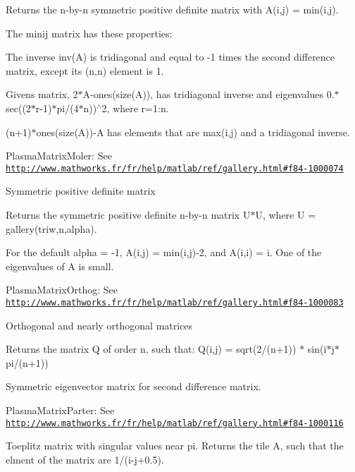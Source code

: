 Returns the n-\/by-\/n symmetric positive definite matrix with A(i,j) = min(i,j).

The minij matrix has these properties\+:
\begin{DoxyItemize}
\item The inverse inv(\+A) is tridiagonal and equal to -\/1 times the second difference matrix, except its (n,n) element is 1.
\item Givens\textquotesingle{} matrix, 2$\ast$\+A-\/ones(size(\+A)), has tridiagonal inverse and eigenvalues 0.$\ast$sec((2$\ast$r-\/1)$\ast$pi/(4$\ast$n))$^\wedge$2, where r=1\+:n.
\item (n+1)$\ast$ones(size(\+A))-\/\+A has elements that are max(i,j) and a tridiagonal inverse.
\end{DoxyItemize}

\begin{DoxyItemize}
\item Plasma\+Matrix\+Moler\+: See \href{http://www.mathworks.fr/fr/help/matlab/ref/gallery.html#f84-1000074}{\tt http\+://www.\+mathworks.\+fr/fr/help/matlab/ref/gallery.\+html\#f84-\/1000074}\end{DoxyItemize}
Symmetric positive definite matrix

Returns the symmetric positive definite n-\/by-\/n matrix U\textquotesingle{}$\ast$\+U, where U = gallery(\textquotesingle{}triw\textquotesingle{},n,alpha).

For the default alpha = -\/1, A(i,j) = min(i,j)-\/2, and A(i,i) = i. One of the eigenvalues of A is small.

\begin{DoxyItemize}
\item Plasma\+Matrix\+Orthog\+: See \href{http://www.mathworks.fr/fr/help/matlab/ref/gallery.html#f84-1000083}{\tt http\+://www.\+mathworks.\+fr/fr/help/matlab/ref/gallery.\+html\#f84-\/1000083}\end{DoxyItemize}
Orthogonal and nearly orthogonal matrices

Returns the matrix Q of order n, such that\+: Q(i,j) = sqrt(2/(n+1)) $\ast$ sin(i$\ast$j$\ast$pi/(n+1))

Symmetric eigenvector matrix for second difference matrix.

\begin{DoxyItemize}
\item Plasma\+Matrix\+Parter\+: See \href{http://www.mathworks.fr/fr/help/matlab/ref/gallery.html#f84-1000116}{\tt http\+://www.\+mathworks.\+fr/fr/help/matlab/ref/gallery.\+html\#f84-\/1000116}\end{DoxyItemize}
Toeplitz matrix with singular values near pi. Returns the tile A, such that the elment of the matrix are 1/(i-\/j+0.5).

